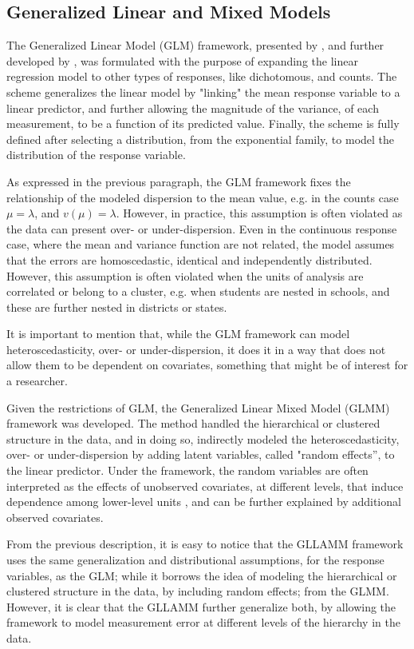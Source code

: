 \subsection{Generalized Linear and Mixed Models}

The Generalized Linear Model (GLM) framework, presented by \citet{Nelder_et_al_1972}, and further developed by \citet{Nelder_et_al_1989}, was formulated with the purpose of expanding the linear regression model to other types of responses, like dichotomous, and counts. The scheme generalizes the linear model by "linking" the mean response variable to a linear predictor, and further allowing the magnitude of the variance, of each measurement, to be a function of its predicted value. Finally, the scheme is fully defined after selecting a distribution, from the exponential family, to model the distribution of the response variable.

As expressed in the previous paragraph, the GLM framework fixes the relationship of the modeled dispersion to the mean value, e.g. in the counts case $\mu = \lambda$, and $v(\mu) = \lambda$. However, in practice, this assumption is often violated as the data can present over- or under-dispersion. Even in the continuous response case, where the mean and variance function are not related, the model assumes that the errors are homoscedastic, identical and independently distributed. However, this assumption is often violated when the units of analysis are correlated or belong to a cluster, e.g. when students are nested in schools, and these are further nested in districts or states.

It is important to mention that, while the GLM framework can model heteroscedasticity, over- or under-dispersion, it does it in a way that does not allow them to be dependent on covariates, something that might be of interest for a researcher.

Given the restrictions of GLM, the Generalized Linear Mixed Model (GLMM) framework was developed. The method handled the hierarchical or clustered structure in the data, and in doing so, indirectly modeled the heteroscedasticity, over- or under-dispersion by adding latent variables, called "random effects”, to the linear predictor. Under the framework, the random variables are often interpreted as the effects of unobserved covariates, at different levels, that induce dependence among lower-level units \citep{Rabe_et_al_2012}, and can be further explained by additional observed covariates. 

From the previous description, it is easy to notice that the GLLAMM framework uses the same generalization and distributional assumptions, for the response variables, as the GLM; while it borrows the idea of modeling the hierarchical or clustered structure in the data, by including random effects; from the GLMM. However, it is clear that the GLLAMM further generalize both, by allowing the framework to model measurement error at different levels of the hierarchy in the data.



